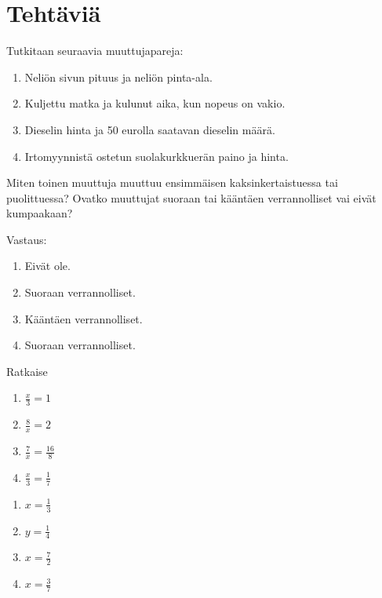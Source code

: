 \section*{Tehtäviä}

\begin{tehtava}
    Tutkitaan seuraavia muuttujapareja:
    \begin{enumerate}
        \item Neliön sivun pituus ja neliön pinta-ala.
        \item Kuljettu matka ja kulunut aika, kun nopeus on vakio.
        \item Dieselin hinta ja 50 eurolla saatavan dieselin määrä.
        \item Irtomyynnistä ostetun suolakurkkuerän paino ja hinta.
    \end{enumerate}
    Miten toinen muuttuja muuttuu ensimmäisen kaksinkertaistuessa tai puolittuessa? Ovatko muuttujat suoraan tai kääntäen verrannolliset vai eivät kumpaakaan?
    \begin{vastaus}
        Vastaus:
        \begin{enumerate}
            \item Eivät ole.
            \item Suoraan verrannolliset.
            \item Kääntäen verrannolliset.
            \item Suoraan verrannolliset.
        \end{enumerate}
    \end{vastaus}
\end{tehtava}

\begin{tehtava}
Ratkaise
\begin{enumerate}
\item $ \frac{x}{3} = 1$
\item $ \frac{8}{x} = 2$
\item $ \frac{7}{x} = \frac{16}{8}$
\item $ \frac{x}{3} = \frac{1}{7}$
\end{enumerate}
\begin{vastaus}
\begin{enumerate}
\item $x= \frac{1}{3}$
\item $y= \frac{1}{4}$
\item $x= \frac{7}{2}$
\item $x= \frac{3}{7}$
\end{enumerate}
\end{vastaus}
\end{tehtava}

